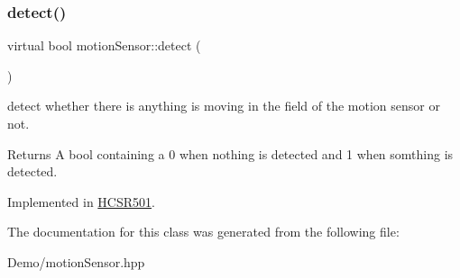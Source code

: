 \subsubsection{\texorpdfstring{detect()}{detect()}}
{\footnotesize\ttfamily virtual bool motion\+Sensor\+::detect (\begin{DoxyParamCaption}{ }\end{DoxyParamCaption})\hspace{0.3cm}{\ttfamily [pure virtual]}}

detect whether there is anything is moving in the field of the motion sensor or not. \begin{DoxyReturn}{Returns}
A bool containing a 0 when nothing is detected and 1 when somthing is detected. 
\end{DoxyReturn}


Implemented in \mbox{\hyperlink{class_h_c_s_r501_a75456a573bf0066ee648f8f1a39d4966}{H\+C\+S\+R501}}.



The documentation for this class was generated from the following file\+:\begin{DoxyCompactItemize}
\item 
Demo/motion\+Sensor.\+hpp\end{DoxyCompactItemize}
